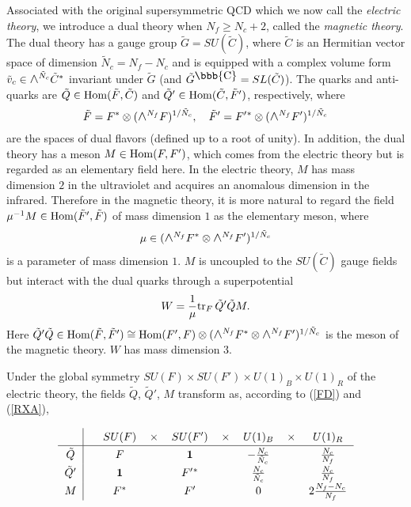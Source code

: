 \documentclass[lecture]{qft-l}
\newcommand{\co}{{\mbox{\bbb{C}}}}
\newcommand{\medwedge}{\mbox{\fontsize{12pt}{0pt}\selectfont $\wedge$}}
\newcommand{\inv}[1]{\frac{1}{#1}}
\newcommand{\one}{\mathbf{1}}
\newcommand{\tr}{{\rm tr}}
\newcommand{\Hom}{{\rm Hom}}
\newcommand{\FT}{F'}%
\newcommand{\GD}{\tilde{G}}
\newcommand{\CD}{\tilde{C}}
\newcommand{\ND}{\tilde{N}_c}
\newcommand{\vD}{\tilde{v}_c}
\newcommand{\FD}{\tilde{F}}
\newcommand{\QD}{\tilde{Q}}
\newcommand{\FDT}{\tilde{F}'}
\newcommand{\QDT}{\tilde{Q}'}
\newcommand{\GLOBAL}{SU(F)\times SU(\FT)\times U(1)_B\times U(1)_R}
\newcommand{\LINE}{\medwedge^{N_f}F^*\otimes\medwedge^{N_f}\FT}
\numberwithin{figure}{chapter}
\begin{document}

Associated with the original supersymmetric QCD which we now call
the {\em electric theory}, we introduce a dual theory when $N_f\ge N_c+2$, 
called the {\em magnetic theory}.
The dual theory has a gauge group $\GD=SU(\CD)$, where $\CD$ is an Hermitian
vector space of dimension $\ND=N_f-N_c$ and is equipped with a complex volume
form $\vD\in\medwedge^{\ND}\CD^*$ invariant under $\GD$ 
(and $\GD^\co=SL(\CD)$).
The quarks and anti-quarks are $\QD\in\Hom(\FD,\CD)$ and 
$\QDT\in\Hom(\CD,\FDT)$, respectively, where
	\begin{equation}\label{FD}
\FD=F^*\otimes(\medwedge^{N_f}F)^{1/\ND},\quad
\FDT=\FT{^{*}}\otimes(\medwedge^{N_f}\FT)^{1/\ND}
	\end{equation}
are the spaces of dual flavors (defined up to a root of unity).
In addition, the dual theory has a meson $M\in\Hom(F,\FT)$, which
comes from the electric theory but is regarded as an elementary field here.
In the electric theory, $M$ has mass dimension $2$ in the ultraviolet
and acquires an anomalous dimension in the infrared.
Therefore in the magnetic theory, it is more natural to regard the field
$\mu^{-1}M\in\Hom(\FDT,\FD)$ of mass dimension $1$ as the elementary meson,
where
	\begin{equation}\label{mu}
\mu\in(\LINE)^{1/\ND}
	\end{equation}
is a parameter of mass dimension $1$.
$M$ is uncoupled to the $SU(\CD)$ gauge fields but interact with the dual
quarks through a superpotential
	\begin{equation}\label{WD}
W=\inv{\mu}\tr_F\,\QDT\QD M.
	\end{equation}
Here $\QDT\QD\in\Hom(\FD,\FDT)\cong\Hom(\FT,F)\otimes(\LINE)^{1/\ND}$
is the meson of the magnetic theory.
$W$ has mass dimension $3$.

Under the global symmetry $\GLOBAL$ of the electric 
theory, the fields
$\QD$, $\QDT$, $M$ transform 
as, according to (\ref{FD}) and (\ref{RXA}), 

\bigskip
\begin{equation}
\renewcommand{\arraystretch}{1.3}
\begin{tabular}{c|cccccccc}\label{Dtrans}
&&    $SU(F)$	&   $\times$	&   $SU(\FT)$	&   $\times$
&    $U(1)_B$	&   $\times$	&   $U(1)_R$	\\
\hline
$\QD$	&&     $F$	&		&   $\one$	&
&  $-\frac{N_c}{\ND}$	&	&  $\frac{N_c}{N_f}$  \\
$\QDT$	&&     $\one$	&	&    $\FT{^{*}}$	&	
&  $\frac{N_c}{\ND}$	&	&  $\frac{N_c}{N_f}$  \\
$M$   &&    $F^*$	&		&   $\FT$	&
&     $0$	&		&  $2\frac{N_f-N_c}{N_f}$
\end{tabular}
\end{equation}
\end{document}

